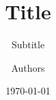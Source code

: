
\title[Title at bottom]{Title}
\subtitle{Subtitle}
\author[Authors at bottom]{Authors}
\date[\today]{\today}

\raggedright
\AtBeginSection{\frame{\sectionpage}}
